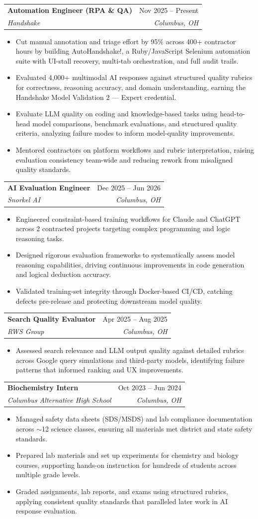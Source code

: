 \documentclass[letterpaper,11pt]{article}
\makeatletter
\newcommand{\resumeItem}[1]{
  \item\small{
    {#1 \vspace{0pt}}
  }
}
\newcommand{\resumeSubheading}[4]{
  \vspace{-1pt}\item
    \begin{tabular*}{0.97\textwidth}[t]{l@{\extracolsep{\fill}}r}
      \textbf{#1} & #2 \\
      \textit{\small#3} & \textit{\small #4} \\
    \end{tabular*}\vspace{-5pt}
}
\newcommand{\resumeItemListStart}{\begin{itemize}[leftmargin=0.15in]}
\newcommand{\resumeItemListEnd}{\end{itemize}\vspace{-4pt}}
\makeatother
\begin{document}
    \resumeSubheading
      {Automation Engineer (RPA \& QA)}{Nov 2025 -- Present}
      {Handshake}{Columbus, OH}
      \resumeItemListStart
        \resumeItem{Cut manual annotation and triage effort by 95\% across 400+ contractor hours by building AutoHandshake!, a Ruby/JavaScript Selenium automation suite with UI-stall recovery, multi-tab orchestration, and full audit trails.}
        \resumeItem{Evaluated 4,000+ multimodal AI responses against structured quality rubrics for correctness, reasoning accuracy, and domain understanding, earning the Handshake Model Validation 2 --- Expert credential.}
        \resumeItem{Evaluate LLM quality on coding and knowledge-based tasks using head-to-head model comparisons, benchmark evaluations, and structured quality criteria, analyzing failure modes to inform model-quality improvements.}
        \resumeItem{Mentored contractors on platform workflows and rubric interpretation, raising evaluation consistency team-wide and reducing rework from misaligned quality standards.}
      \resumeItemListEnd

    \resumeSubheading
      {AI Evaluation Engineer}{Dec 2025 -- Jun 2026}
      {Snorkel AI}{Columbus, OH}
      \resumeItemListStart
        \resumeItem{Engineered constraint-based training workflows for Claude and ChatGPT across 2 contracted projects targeting complex programming and logic reasoning tasks.}
        \resumeItem{Designed rigorous evaluation frameworks to systematically assess model reasoning capabilities, driving continuous improvements in code generation and logical deduction accuracy.}
        \resumeItem{Validated training-set integrity through Docker-based CI/CD, catching defects pre-release and protecting downstream model quality.}
      \resumeItemListEnd

    \resumeSubheading
      {Search Quality Evaluator}{Apr 2025 -- Aug 2025}
      {RWS Group}{Columbus, OH}
      \resumeItemListStart
        \resumeItem{Assessed search relevance and LLM output quality against detailed rubrics across Google query simulations and third-party models, identifying failure patterns that informed ranking and UX improvements.}
      \resumeItemListEnd

    \resumeSubheading
      {Biochemistry Intern}{Oct 2023 -- Jun 2024}
      {Columbus Alternative High School}{Columbus, OH}
      \resumeItemListStart
        \resumeItem{Managed safety data sheets (SDS/MSDS) and lab compliance documentation across $\sim$12 science classes, ensuring all materials met district and state safety standards.}
        \resumeItem{Prepared lab materials and set up experiments for chemistry and biology courses, supporting hands-on instruction for hundreds of students across multiple grade levels.}
        \resumeItem{Graded assignments, lab reports, and exams using structured rubrics, applying consistent quality standards that paralleled later work in AI response evaluation.}
      \resumeItemListEnd
\end{document}
